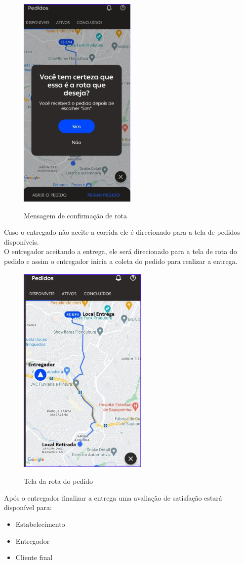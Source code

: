 \begin{figure} [!ht]
    {\centering
    \caption{Mensagem de confirmação de rota}
    \includegraphics[height=0.5\linewidth]{figuras/mensagementregador.png} 
    \label{fig:enter-label}
    }
\end{figure}

Caso o entregado não aceite a corrida ele é direcionado para a tela de pedidos disponíveis.\\

O entregador aceitando a entrega, ele será direcionado para a tela de rota do pedido e assim o entregador inicia a coleta do pedido para realizar a entrega.

\begin{figure} [!ht]
 {  \centering
    \caption{Tela da rota do pedido}
    \includegraphics[width=0.3\linewidth]{figuras/rota do entregador.png}
    \label{fig:enter-label}
    }
\end{figure}

Após o entregador finalizar a entrega uma avaliação de satisfação estará disponível para:

\begin{itemize}
    \item Estabelecimento
    \item Entregador
    \item Cliente final
\end{itemize}

